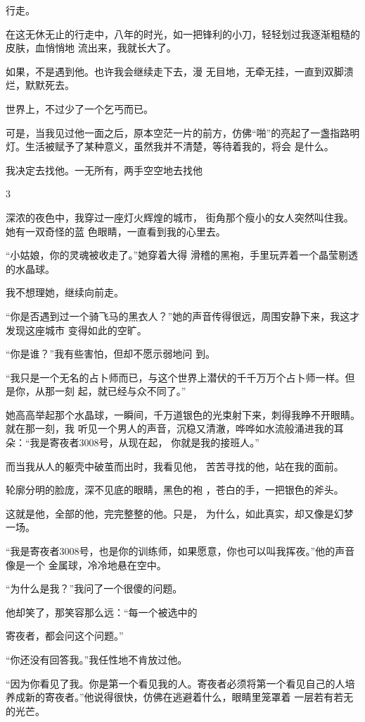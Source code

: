\documentclass{article}
\begin{document}
行走。 

在这无休无止的行走中，八年的时光，如一把锋利的小刀，轻轻划过我逐渐粗糙的皮肤，血悄悄地
流出来，我就长大了。 

如果，不是遇到他。也许我会继续走下去，漫
无目地，无牵无挂，一直到双脚溃烂，默默死去。 


世界上，不过少了一个乞丐而已。 

可是，当我见过他一面之后，原本空茫一片的前方，仿佛“啪”的亮起了一盏指路明灯。生活被赋予了某种意义，虽然我并不清楚，等待着我的，将会
是什么。 

我决定去找他。一无所有，两手空空地去找他


3 

深浓的夜色中，我穿过一座灯火辉煌的城市，
\newpage
街角那个瘦小的女人突然叫住我。她有一双奇怪的蓝
色眼睛，一直看到我的心里去。 

“小姑娘，你的灵魂被收走了。”她穿着大得
滑稽的黑袍，手里玩弄着一个晶莹剔透的水晶球。 


我不想理她，继续向前走。 

“你是否遇到过一个骑飞马的黑衣人？”她的声音传得很远，周围安静下来，我这才发现这座城市
变得如此的空旷。 

“你是谁？”我有些害怕，但却不愿示弱地问
到。 

“我只是一个无名的占卜师而已，与这个世界上潜伏的千千万万个占卜师一样。但是你，从那一刻
起，就已经与众不同了。” 

她高高举起那个水晶球，一瞬间，千万道银色的光束射下来，刺得我睁不开眼睛。就在那一刻，我
\newpage
听见一个男人的声音，沉稳又清澈，哗哗如水流般涌进我的耳朵：“我是寄夜者3008号，从现在起，
你就是我的接班人。” 


而当我从人的躯壳中破茧而出时，我看见他，
苦苦寻找的他，站在我的面前。 

轮廓分明的脸庞，深不见底的眼睛，黑色的袍
，苍白的手，一把银色的斧头。 

这就是他，全部的他，完完整整的他。只是，
为什么，如此真实，却又像是幻梦一场。 

“我是寄夜者3008号，也是你的训练师，如果愿意，你也可以叫我挥夜。”他的声音像是一个
金属球，冷冷地悬在空中。 


“为什么是我？”我问了一个很傻的问题。 

他却笑了，那笑容那么远：“每一个被选中的
\newpage

寄夜者，都会问这个问题。” 

“你还没有回答我。”我任性地不肯放过他。
 

“因为你看见了我。你是第一个看见我的人。寄夜者必须将第一个看见自己的人培养成新的寄夜者。”他说得很快，仿佛在逃避着什么，眼睛里笼罩着
一层若有若无的光芒。 
\end{document}
